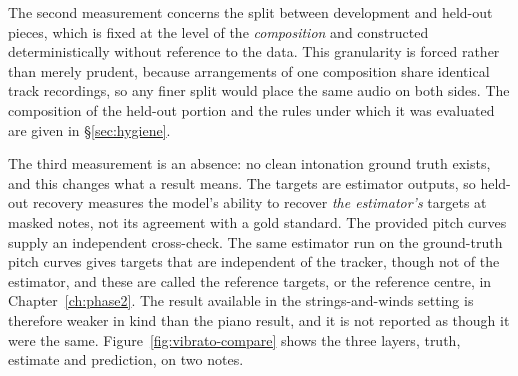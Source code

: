 The second measurement concerns the split between development and held-out
pieces, which is fixed at the level of the \emph{composition} and constructed
deterministically without reference to the data. This granularity is forced
rather than merely prudent, because arrangements of one composition share
identical track recordings, so any finer split would place the same audio on
both sides. The composition of the held-out portion and the rules under which
it was evaluated are given in \S\ref{sec:hygiene}.

The third measurement is an absence: no clean intonation ground truth exists,
and this changes what a result means. The targets are estimator outputs, so
held-out recovery measures the model's ability to recover \emph{the
estimator's} targets at masked notes, not its agreement with a gold standard.
The provided pitch curves supply an independent cross-check. The same
estimator run on the ground-truth pitch curves gives targets that are
independent of the tracker, though not of the estimator, and these are called
the reference targets, or the reference centre, in Chapter~\ref{ch:phase2}.
The result available in the strings-and-winds setting is therefore weaker in
kind than the piano result, and it is not reported as though it were the
same. Figure~\ref{fig:vibrato-compare} shows the three layers, truth,
estimate and prediction, on two notes.



